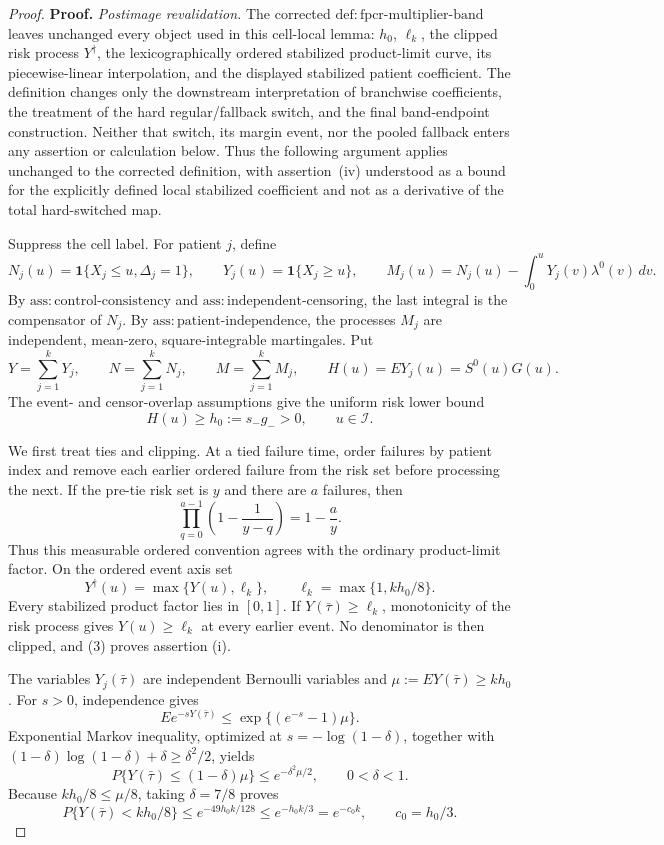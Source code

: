 \documentclass{article}
\begin{document}
\begin{proof}
\textbf{Proof.}
\emph{Postimage revalidation.}
The corrected \(\mathrm{def:fpcr\mbox{-}multiplier\mbox{-}band}\) leaves unchanged every object used in this cell-local lemma: \(h_0\), \(\ell_k\), the clipped risk process \(Y^\dagger\), the lexicographically ordered stabilized product-limit curve, its piecewise-linear interpolation, and the displayed stabilized patient coefficient. The definition changes only the downstream interpretation of branchwise coefficients, the treatment of the hard regular/fallback switch, and the final band-endpoint construction. Neither that switch, its margin event, nor the pooled fallback enters any assertion or calculation below. Thus the following argument applies unchanged to the corrected definition, with assertion~(iv) understood as a bound for the explicitly defined local stabilized coefficient and not as a derivative of the total hard-switched map.

Suppress the cell label.  For patient \(j\), define
\[
 N_j(u)=\mathbf 1\{X_j\leq u,\Delta_j=1\},\qquad
 Y_j(u)=\mathbf 1\{X_j\geq u\},\qquad
 M_j(u)=N_j(u)-\int_0^uY_j(v)\lambda^0(v)\,dv.             \tag{1}
\]
By \(\mathrm{ass:control\mbox{-}consistency}\) and
\(\mathrm{ass:independent\mbox{-}censoring}\), the last integral is the
compensator of \(N_j\).  By
\(\mathrm{ass:patient\mbox{-}independence}\), the processes \(M_j\) are
independent, mean-zero, square-integrable martingales.  Put
\[
 Y=\sum_{j=1}^kY_j,\qquad N=\sum_{j=1}^kN_j,
 \qquad M=\sum_{j=1}^kM_j,
 \qquad H(u)=E Y_j(u)=S^0(u)G(u).
\]
The event- and censor-overlap assumptions give the uniform risk lower bound
\[
 H(u)\geq h_0:=s_-g_->0,
 \qquad u\in\mathcal I.                                  \tag{2}
\]

We first treat ties and clipping.  At a tied failure time, order failures by
patient index and remove each earlier ordered failure from the risk set before
processing the next.  If the pre-tie risk set is \(y\) and there are \(a\)
failures, then
\[
 \prod_{q=0}^{a-1}\left(1-\frac{1}{y-q}\right)=1-\frac{a}{y}. \tag{3}
\]
Thus this measurable ordered convention agrees with the ordinary
product-limit factor.  On the ordered event axis set
\[
 Y^\dagger(u)=\max\{Y(u),\ell_k\},
 \qquad \ell_k=\max\{1,kh_0/8\}.
\]
Every stabilized product factor lies in \([0,1]\).  If
\(Y(\bar\tau)\geq\ell_k\), monotonicity of the risk process gives
\(Y(u)\geq\ell_k\) at every earlier event.  No denominator is then clipped,
and (3) proves assertion (i).

The variables \(Y_j(\bar\tau)\) are independent Bernoulli variables and
\(\mu:=E Y(\bar\tau)\geq kh_0\).  For \(s>0\), independence gives
\[
 E e^{-sY(\bar\tau)}
 \leq \exp\{(e^{-s}-1)\mu\}.
\]
Exponential Markov inequality, optimized at
\(s=-\log(1-\delta)\), together with
\((1-\delta)\log(1-\delta)+\delta\geq\delta^2/2\), yields
\[
 P\{Y(\bar\tau)\leq(1-\delta)\mu\}
 \leq e^{-\delta^2\mu/2},
 \qquad 0<\delta<1.                                      \tag{4}
\]
Because \(kh_0/8\leq\mu/8\), taking \(\delta=7/8\) proves
\[
 P\{Y(\bar\tau)<kh_0/8\}
 \leq e^{-49h_0k/128}
 \leq e^{-h_0k/3}=e^{-c_0k},
 \qquad c_0=h_0/3.                                       \tag{5}
\]


\end{proof}
\end{document}
